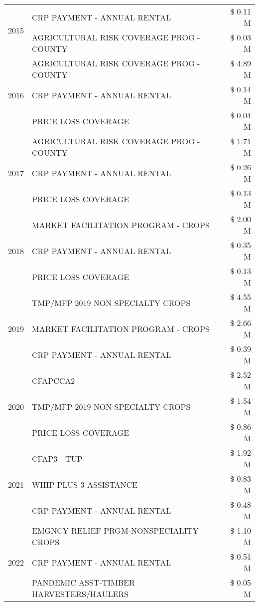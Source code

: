\begin{tabular}{llr}
\cline{1-3}
\multirow[t]{2}{*}{2015} & CRP PAYMENT - ANNUAL RENTAL & \$ 0.11 M \\
 & AGRICULTURAL RISK COVERAGE PROG - COUNTY & \$ 0.03 M \\
\cline{1-3}
\multirow[t]{3}{*}{2016} & AGRICULTURAL RISK COVERAGE PROG - COUNTY & \$ 4.89 M \\
 & CRP PAYMENT - ANNUAL RENTAL & \$ 0.14 M \\
 & PRICE LOSS COVERAGE & \$ 0.04 M \\
\cline{1-3}
\multirow[t]{3}{*}{2017} & AGRICULTURAL RISK COVERAGE PROG - COUNTY & \$ 1.71 M \\
 & CRP PAYMENT - ANNUAL RENTAL & \$ 0.26 M \\
 & PRICE LOSS COVERAGE & \$ 0.13 M \\
\cline{1-3}
\multirow[t]{3}{*}{2018} & MARKET FACILITATION PROGRAM - CROPS & \$ 2.00 M \\
 & CRP PAYMENT - ANNUAL RENTAL & \$ 0.35 M \\
 & PRICE LOSS COVERAGE & \$ 0.13 M \\
\cline{1-3}
\multirow[t]{3}{*}{2019} & TMP/MFP 2019 NON SPECIALTY CROPS & \$ 4.55 M \\
 & MARKET FACILITATION PROGRAM - CROPS & \$ 2.66 M \\
 & CRP PAYMENT - ANNUAL RENTAL & \$ 0.39 M \\
\cline{1-3}
\multirow[t]{3}{*}{2020} & CFAPCCA2 & \$ 2.52 M \\
 & TMP/MFP 2019 NON SPECIALTY CROPS & \$ 1.54 M \\
 & PRICE LOSS COVERAGE & \$ 0.86 M \\
\cline{1-3}
\multirow[t]{3}{*}{2021} & CFAP3 - TUP & \$ 1.92 M \\
 & WHIP PLUS 3 ASSISTANCE & \$ 0.83 M \\
 & CRP PAYMENT - ANNUAL RENTAL & \$ 0.48 M \\
\cline{1-3}
\multirow[t]{3}{*}{2022} & EMGNCY RELIEF PRGM-NONSPECIALITY CROPS & \$ 1.10 M \\
 & CRP PAYMENT - ANNUAL RENTAL & \$ 0.51 M \\
 & PANDEMIC ASST-TIMBER HARVESTERS/HAULERS & \$ 0.05 M \\
\cline{1-3}
\bottomrule
\end{tabular}
